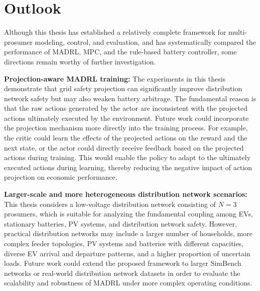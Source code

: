 \section{Outlook}

Although this thesis has established a relatively complete framework for multi-prosumer modeling, control, and evaluation, and has systematically compared the performance of MADRL, MPC, and the rule-based battery controller, some directions remain worthy of further investigation.

\textbf{Projection-aware MADRL training:} The experiments in this thesis demonstrate that grid safety projection can significantly improve distribution network safety but may also weaken battery arbitrage. The fundamental reason is that the raw actions generated by the actor are inconsistent with the projected actions ultimately executed by the environment. Future work could incorporate the projection mechanism more directly into the training process. For example, the critic could learn the effects of the projected actions on the reward and the next state, or the actor could directly receive feedback based on the projected actions during training. This would enable the policy to adapt to the ultimately executed actions during learning, thereby reducing the negative impact of action projection on economic performance.

\textbf{Larger-scale and more heterogeneous distribution network scenarios:} This thesis considers a low-voltage distribution network consisting of \(N=3\) prosumers, which is suitable for analyzing the fundamental coupling among EVs, stationary batteries, PV systems, and distribution network safety. However, practical distribution networks may include a larger number of households, more complex feeder topologies, PV systems and batteries with different capacities, diverse EV arrival and departure patterns, and a higher proportion of uncertain loads. Future work could extend the proposed framework to larger SimBench networks or real-world distribution network datasets in order to evaluate the scalability and robustness of MADRL under more complex operating conditions.


